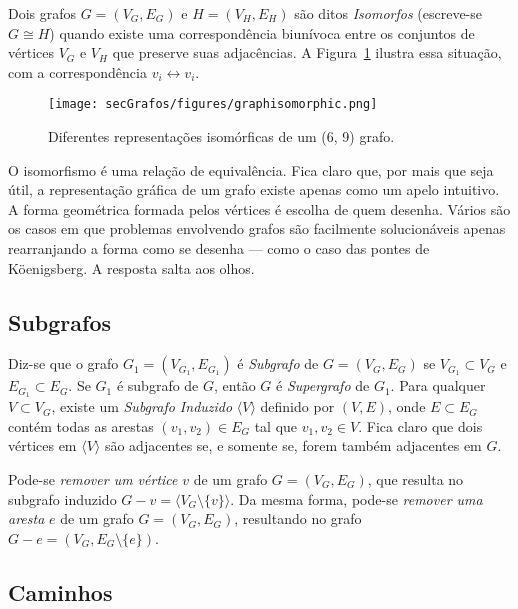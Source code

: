 Dois grafos $G = (V_G, E_G)$ e $H = (V_H, E_H)$ são ditos \textit{Isomorfos} (escreve-se $G \cong H$) quando existe uma correspondência biunívoca entre os conjuntos de vértices $V_G$ e $V_H$ que preserve suas adjacências. A Figura~\ref{fig:graphisomorphic} ilustra essa situação, com a correspondência $v_i \longleftrightarrow v_i$.

\begin{figure}[H]
	\begin{center}
		\texttt{[image: secGrafos/figures/graphisomorphic.png]}
	\end{center}
	\caption{Diferentes representações isomórficas de um (6, 9) grafo.}
	\label{fig:graphisomorphic}
\end{figure}

O isomorfismo é uma relação de equivalência. Fica claro que, por mais que seja útil, a representação gráfica de um grafo existe apenas como um apelo intuitivo. A forma geométrica formada pelos vértices é escolha de quem desenha. Vários são os casos em que problemas envolvendo grafos são facilmente solucionáveis apenas rearranjando a forma como se desenha --- como o caso das pontes de Köenigsberg. A resposta salta aos olhos.

\subsection{Subgrafos}

Diz-se que o grafo $G_1 = (V_{G_1}, E_{G_1})$ é \textit{Subgrafo} de $G = (V_G, E_G)$ se $V_{G_1} \subset V_G$ e $E_{G_1} \subset E_G$. Se $G_1$ é subgrafo de $G$, então $G$ é \textit{Supergrafo} de $G_1$. Para qualquer $V \subset V_G$, existe um \textit{Subgrafo Induzido} $\langle V \rangle$ definido por $(V, E)$, onde $E \subset E_G$ contém todas as arestas $(v_1, v_2) \in E_G$ tal que $v_1, v_2 \in V$. 
Fica claro que dois vértices em $\langle V \rangle$ são adjacentes se, e somente se, forem também adjacentes em $G$.

Pode-se \textit{remover um vértice} $v$ de um grafo $G = (V_G, E_G)$, que resulta no subgrafo induzido $G - v = \langle V_G \setminus \{v\}\rangle$. Da mesma forma, pode-se \textit{remover uma aresta} $e$ de um grafo $G = (V_G, E_G)$, resultando no grafo $G-e = (V_G, E_G \setminus \{e\})$.

\subsection{Caminhos}


